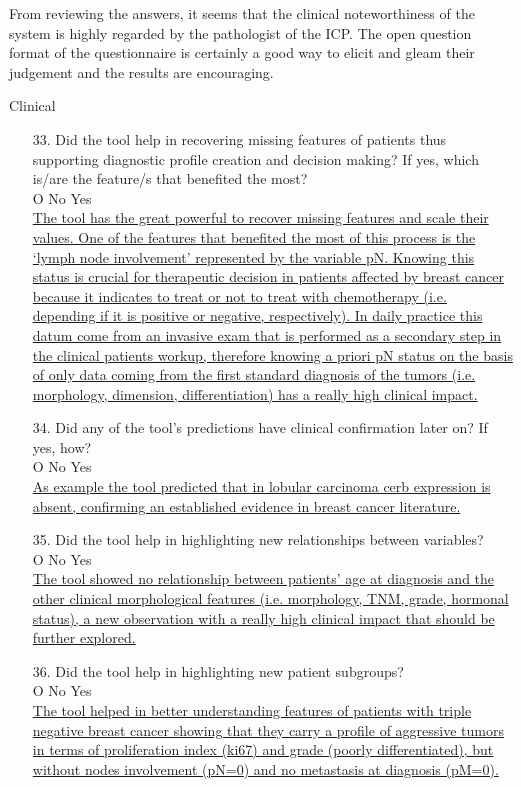 From reviewing the answers, it seems that the clinical noteworthiness  of the system is highly regarded by the pathologist of the ICP.
The open question format of the questionnaire is certainly a good way to elicit and gleam their judgement and the results are encouraging.

\begin{framed}
	{\Large Clinical}
	\begin{enumerate}[resume]
		\item[33.] Did the tool help in recovering missing features of patients thus supporting diagnostic profile creation and decision making? If yes, which is/are the feature/s that benefited the most? \\
		O No  Yes\\
		\ul{The tool has the great powerful to recover missing features and scale their values. One of the features that benefited the most of this process is the `lymph node involvement' represented by the variable pN. Knowing this status is crucial for therapeutic decision in patients affected by breast cancer because it indicates to treat or not to treat with chemotherapy (i.e. depending if it is positive or negative, respectively). In daily practice this datum come from an invasive exam that is performed as a secondary step in the clinical patients workup, therefore knowing a priori pN status on the basis of only data coming from the first standard diagnosis of the tumors (i.e. morphology, dimension, differentiation) has a really high clinical impact.}
		\item[34.] Did any of the tool's predictions have clinical confirmation later on?  If yes, how? \\
		O No  Yes\\
		\ul{As example the tool predicted that in lobular carcinoma cerb expression is absent, confirming an established evidence in breast cancer literature.}
		\item[35.] Did the tool help in highlighting new relationships between variables? \\
		O No  Yes\\
		\ul{The tool showed no relationship between patients' age at diagnosis and the other clinical morphological features (i.e. morphology, TNM, grade, hormonal status), a new observation with a really high clinical impact that should be further explored.}
		\item[36.] Did the tool help in highlighting new patient subgroups? \\
		O No  Yes\\
		\ul{The tool helped in better understanding features of patients with triple negative breast cancer showing that they carry a profile of aggressive tumors in terms of proliferation index (ki67) and grade (poorly differentiated), but without nodes involvement (pN=0) and no metastasis at diagnosis (pM=0).}
	\end{enumerate}
	\label{ques:clinical}
\end{framed}

